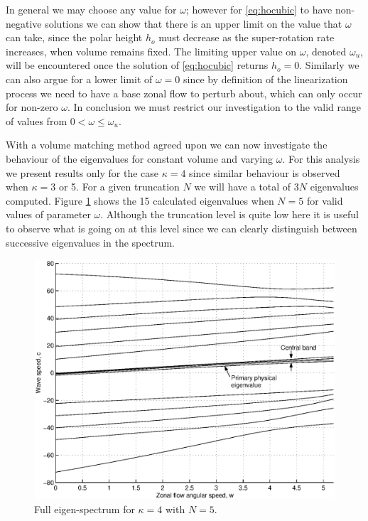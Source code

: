 In general we may choose any value for $\omega$; however for \eqref{eq:hocubic} to have non-negative solutions we can show that there is an upper limit on the value that $\omega$ can take, since the polar height $h_o$ must decrease as the super-rotation rate increases, when volume remains fixed. The limiting upper value on $\omega$, denoted $\omega_u$, will be encountered once the solution of \eqref{eq:hocubic} returns $h_o=0$. Similarly we can also argue for a lower limit of $\omega=0$ since by definition of the linearization process we need to have a base zonal flow to perturb about, which can only occur for non-zero $\omega$. In conclusion we must restrict our investigation to the valid range of values from $0<\omega \le \omega_u$. 

With a volume matching method agreed upon we can now investigate the behaviour of the eigenvalues for constant volume and varying $\omega$. For this analysis we present results only for the case $\kappa=4$ since similar behaviour is observed when $\kappa=3$ or 5. For a given truncation $N$ we will have a total of $3N$ eigenvalues computed. Figure \ref{fig:wvcincompfull} shows the 15 calculated eigenvalues when $N=5$ for valid values of parameter $\omega$. Although the truncation level is quite low here it is useful to observe what is going on at this level since we can clearly distinguish between successive eigenvalues in the spectrum. 
\begin{figure}[htbp]
	\centering
		\includegraphics[scale=0.7]{IMAGES/kappa4fullspectrumN5.eps}
	\caption{Full eigen-spectrum for $\kappa=4$ with $N=5$.}
	\label{fig:wvcincompfull}
\end{figure}

